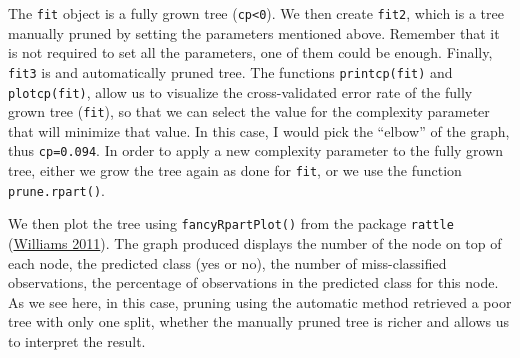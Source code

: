 \documentclass[
]{svmono}
\begin{document}
The \texttt{fit} object is a fully grown tree (\texttt{cp\textless{}0}). We then create \texttt{fit2},
which is a tree manually pruned by setting the parameters mentioned
above. Remember that it is not required to set all the parameters, one
of them could be enough. Finally, \texttt{fit3} is and automatically pruned
tree. The functions \texttt{printcp(fit)} and \texttt{plotcp(fit)}, allow us to
visualize the cross-validated error rate of the fully grown tree
(\texttt{fit}), so that we can select the value for the complexity parameter
that will minimize that value. In this case, I would pick the ``elbow'' of
the graph, thus \texttt{cp=0.094}. In order to apply a new complexity parameter
to the fully grown tree, either we grow the tree again as done for
\texttt{fit}, or we use the function \texttt{prune.rpart()}.

We then plot the tree using \texttt{fancyRpartPlot()} from the package \texttt{rattle}
(\protect\hyperlink{ref-williams2011}{Williams 2011}). The graph produced displays the number of the node on
top of each node, the predicted class (yes or no), the number of
miss-classified observations, the percentage of observations in the
predicted class for this node. As we see here, in this case, pruning
using the automatic method retrieved a poor tree with only one split,
whether the manually pruned tree is richer and allows us to interpret
the result.
\end{document}
